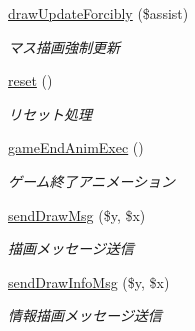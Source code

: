 \begin{DoxyCompactItemize}
\hyperlink{class_reversi_play_a3ae28eb121caf59932218ea7d1fca81d}{draw\+Update\+Forcibly} (\$assist)
\begin{DoxyCompactList}\small\item\em マス描画強制更新 \end{DoxyCompactList}\item 
\hyperlink{class_reversi_play_a4a20559544fdf4dcb457e258dc976cf8}{reset} ()
\begin{DoxyCompactList}\small\item\em リセット処理 \end{DoxyCompactList}\item 
\hyperlink{class_reversi_play_acbcd366da8242203ae52fb685fbc929e}{game\+End\+Anim\+Exec} ()
\begin{DoxyCompactList}\small\item\em ゲーム終了アニメーション \end{DoxyCompactList}\item 
\hyperlink{class_reversi_play_af27aaf13f15a080c006432338a06c481}{send\+Draw\+Msg} (\$y, \$x)
\begin{DoxyCompactList}\small\item\em 描画メッセージ送信 \end{DoxyCompactList}\item 
\hyperlink{class_reversi_play_a829b61937e857a9f1b5b371be25dbabd}{send\+Draw\+Info\+Msg} (\$y, \$x)
\begin{DoxyCompactList}\small\item\em 情報描画メッセージ送信 \end{DoxyCompactList}\end{DoxyCompactItemize}
